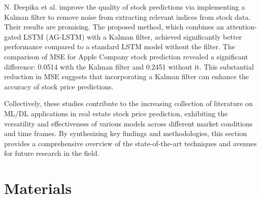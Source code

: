 \documentclass[conference]{IEEEtran}
\begin{document}
N. Deepika et al. \cite{b10} improve the quality of stock predictions via implementing a Kalman filter to remove noise from extracting relevant indices from stock data. Their results are promising. The proposed method, which combines an attention-gated LSTM (AG-LSTM) with a Kalman filter, achieved significantly better performance compared to a standard LSTM model without the filter. The comparison of MSE for Apple Company stock prediction revealed a significant difference: 0.0514 with the Kalman filter and 0.2451 without it. This substantial reduction in MSE suggests that incorporating a Kalman filter can enhance the accuracy of stock price predictions.


Collectively, these studies contribute to the increasing collection of literature on ML/DL applications in real estate stock price prediction, exhibiting the versatility and effectiveness of various models across different market conditions and time frames. By synthesizing key findings and methodologies, this section provides a comprehensive overview of the state-of-the-art techniques and avenues for future research in the field.

\section{\textbf{Materials}}
\end{document}
